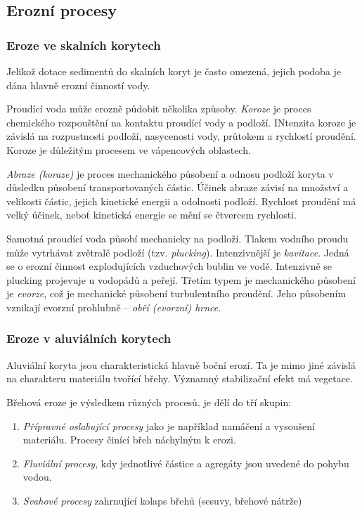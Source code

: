 
\subsection{Erozní procesy}

\subsubsection{Eroze ve skalních korytech}
Jelikož dotace sedimentů do skalních koryt je často omezená, jejich podoba je dána hlavně erozní činností vody. 

Proudící voda může erozně půdobit několika způsoby. \emph{Koroze} je proces chemického rozpouštění na kontaktu proudící vody a podloží. INtenzita koroze je závislá na rozpustnosti podloží, nasycenosti vody, průtokem a rychlostí proudění. Koroze je důležitým procesem ve vápencových oblastech.

\emph{Abraze (koraze)} je proces mechanického působení a odnosu podloží koryta v důsledku působení transportovaných částic. Účinek abraze závisí na množství a velikosti částic, jejich kinetické energii a odolnosti podloží. Rychlost proudění má velký účinek, neboť kinetická energie se mění se čtvercem rychlosti. 

Samotná proudící voda působí mechanicky na podloží. Tlakem vodního proudu může vytrhávat zvětralé podloží (tzv. \emph{plucking}). Intenzivnější je \emph{kavitace}. Jedná se o erozní činnost explodujících vzduchových bublin ve vodě. Intenzivně se plucking projevuje u vodopádů a peřejí. Třetím typem je mechanického působení je \emph{evorze}, což je mechanické působení turbulentního proudění. Jeho působením vznikají evorzní prohlubně -- \emph{obří (evorzní) hrnce}.

\subsubsection{Eroze v aluviálních korytech}
Aluviální koryta jsou charakteristická hlavně boční erozí. Ta je mimo jiné závislá na charakteru materiálu tvořící břehy. Významný stabilizační efekt má vegetace.

Břehová eroze je výsledkem různých procesů. \textcite{charltonFundamentalsFluvialGeomorphology2007} je dělí do tří skupin:
\begin{enumerate}
	\item \emph{Přípravné oslabující procesy} jako je například namáčení a vysoušení materiálu. Procesy činící břeh náchylným k erozi.
	\item \emph{Fluviální procesy}, kdy jednotlivé částice a agregáty jsou uvedené do pohybu vodou.
	\item \emph{Svahové procesy} zahrnující kolaps břehů (sesuvy, břehové nátrže)
\end{enumerate}

